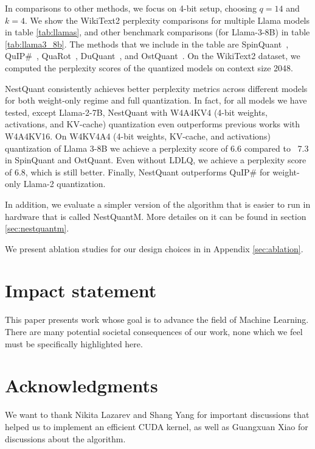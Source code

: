 \documentclass{article}
\theoremstyle{plain}
\theoremstyle{definition}
\theoremstyle{remark}
\begin{document}
In comparisons to other methods, we focus on 4-bit setup, choosing $q=14$ and $k=4$. We show the WikiText2 perplexity comparisons for multiple Llama models in table \ref{tab:llamas}, and other benchmark comparisons (for Llama-3-8B) in table \ref{tab:llama3_8b}. The methods that we include in the table are SpinQuant~\cite{liu2024}, QuIP\#~\cite{tseng2024}, QuaRot~\cite{ashkboos2024}, DuQuant~\cite{lin2024duquantdistributingoutliersdual}, and OstQuant~\cite{hu2025ostquantrefininglargelanguage}. On the WikiText2 dataset, we computed the perplexity scores of the quantized models on context size 2048.

NestQuant consistently achieves better perplexity metrics across different models for both weight-only regime and full quantization. In fact, for all models we have tested, except Llama-2-7B, NestQuant with W4A4KV4 (4-bit weights, activations, and KV-cache) quantization even outperforms previous works with W4A4KV16. On W4KV4A4 (4-bit weights, KV-cache, and activations) quantization of Llama 3-8B we achieve a perplexity score of 6.6 compared to ~7.3 in SpinQuant and OstQuant. Even without LDLQ, we achieve a perplexity score of 6.8, which is still better. Finally, NestQuant outperforms QuIP\# for weight-only Llama-2 quantization.

In addition, we evaluate a simpler version of the algorithm that is easier to run in hardware that is called NestQuantM. More detailes on it can be found in section \ref{sec:nestquantm}.

We present ablation studies for our design choices in in Appendix \ref{sec:ablation}.

\section*{Impact statement}

This paper presents work whose goal is to advance the field of Machine Learning. There are many potential societal consequences of our work, none which we feel must be specifically highlighted here.

\section*{Acknowledgments}

We want to thank Nikita Lazarev and Shang Yang for important discussions that helped us to implement an efficient CUDA kernel, as well as Guangxuan Xiao for discussions about the algorithm.
\end{document}
